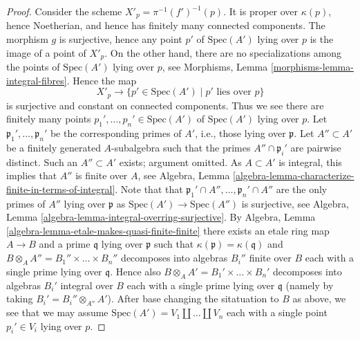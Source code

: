\begin{proof}
\medskip\noindent
Consider the scheme $X'_p = \pi^{-1}(f')^{-1}(p)$.
It is proper over $\kappa(p)$, hence Noetherian, and hence has finitely
many connected components. The morphism $g$ is surjective, hence any
point $p'$ of $\text{Spec}(A')$ lying over $p$ is the image
of a point of $X'_p$. On the other hand, there are no specializations
among the points of $\text{Spec}(A')$ lying over $p$, see
Morphisms, Lemma \ref{morphisms-lemma-integral-fibres}.
Hence the map
$$
X'_p \longrightarrow \{p' \in \text{Spec}(A') \mid p' \text{ lies over } p\}
$$
is surjective and constant on connected components. Thus we see
there are finitely many points $p_1', \ldots, p_n' \in \text{Spec}(A')$
of $\text{Spec}(A')$ lying over $p$.
Let $\mathfrak p_1', \ldots, \mathfrak p_n'$ be the corresponding
primes of $A'$, i.e., those lying over $\mathfrak p$.
Let $A'' \subset A'$ be a finitely generated $A$-subalgebra such that
the primes $A'' \cap \mathfrak p_i'$ are pairwise distinct.
Such an $A'' \subset A'$ exists; argument omitted.
As $A \subset A'$ is integral, this implies that $A''$ is finite over $A$, see
Algebra, Lemma \ref{algebra-lemma-characterize-finite-in-terms-of-integral}.
Note that that $\mathfrak p_1' \cap A'', \ldots, \mathfrak p_n' \cap A''$
are the only primes of $A''$ lying over $\mathfrak p$ as
$\text{Spec}(A') \to \text{Spec}(A'')$ is surjective, see
Algebra, Lemma \ref{algebra-lemma-integral-overring-surjective}.
By
Algebra, Lemma \ref{algebra-lemma-etale-makes-quasi-finite-finite}
there exists an etale ring map $A \to B$ and a prime $\mathfrak q$ lying
over $\mathfrak p$ such that $\kappa(\mathfrak p) = \kappa(\mathfrak q)$
and $B \otimes_A A'' = B_1'' \times \ldots \times B_n''$
decomposes into algebras $B_i''$ finite over $B$ each with a single prime
lying over $\mathfrak q$. Hence also
$B \otimes_A A' = B_1' \times \ldots \times B_n'$
decomposes into algebras $B_i'$ integral over $B$ each with a single prime
lying over $\mathfrak q$ (namely by taking $B_i' = B_i'' \otimes_{A''} A'$).
After base changing the sitatuation to $B$ as above, we see that we may assume
$\text{Spec}(A') = V_1 \coprod \ldots \coprod V_n$
each with a single point $p_i' \in V_i$ lying over $p$.


\end{proof}
